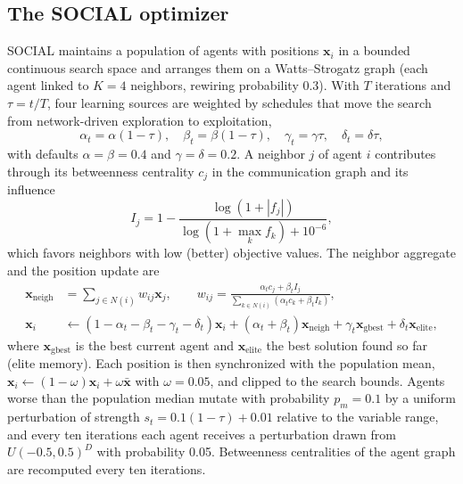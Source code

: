 \documentclass[journal=jcisd8,manuscript=article]{achemso}
\begin{document}
\subsection{The SOCIAL optimizer}
SOCIAL\cite{jalali2026social} maintains a population of agents with positions $\mathbf{x}_i$ in a bounded continuous search space and arranges them on a Watts--Strogatz graph\cite{watts1998small} (each agent linked to $K=4$ neighbors, rewiring probability 0.3). With $T$ iterations and $\tau=t/T$, four learning sources are weighted by schedules that move the search from network-driven exploration to exploitation,
\begin{equation}
\alpha_t=\alpha(1-\tau),\quad \beta_t=\beta(1-\tau),\quad \gamma_t=\gamma\tau,\quad \delta_t=\delta\tau,
\label{eq:schedule}
\end{equation}
with defaults $\alpha=\beta=0.4$ and $\gamma=\delta=0.2$. A neighbor $j$ of agent $i$ contributes through its betweenness centrality $c_j$ in the communication graph and its influence
\begin{equation}
I_j=1-\frac{\log(1+|f_j|)}{\log(1+\max_k f_k)+10^{-6}},
\label{eq:influence}
\end{equation}
which favors neighbors with low (better) objective values. The neighbor aggregate and the position update are
\begin{align}
\mathbf{x}_{\mathrm{neigh}}&=\sum_{j\in N(i)}w_{ij}\mathbf{x}_j,\qquad w_{ij}=\frac{\alpha_tc_j+\beta_tI_j}{\sum_{k\in N(i)}(\alpha_tc_k+\beta_tI_k)},\label{eq:weights}\\
\mathbf{x}_i&\leftarrow(1-\alpha_t-\beta_t-\gamma_t-\delta_t)\mathbf{x}_i+(\alpha_t+\beta_t)\mathbf{x}_{\mathrm{neigh}}+\gamma_t\mathbf{x}_{\mathrm{gbest}}+\delta_t\mathbf{x}_{\mathrm{elite}},\label{eq:update}
\end{align}
where $\mathbf{x}_{\mathrm{gbest}}$ is the best current agent and $\mathbf{x}_{\mathrm{elite}}$ the best solution found so far (elite memory). Each position is then synchronized with the population mean, $\mathbf{x}_i\leftarrow(1-\omega)\mathbf{x}_i+\omega\bar{\mathbf{x}}$ with $\omega=0.05$, and clipped to the search bounds. Agents worse than the population median mutate with probability $p_m=0.1$ by a uniform perturbation of strength $s_t=0.1(1-\tau)+0.01$ relative to the variable range, and every ten iterations each agent receives a perturbation drawn from $U(-0.5,0.5)^D$ with probability 0.05. Betweenness centralities of the agent graph are recomputed every ten iterations.
\end{document}

